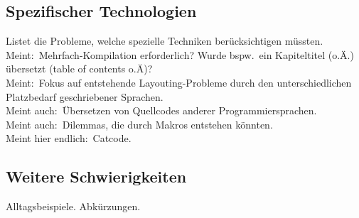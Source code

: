 \subsection{Spezifischer Technologien}
Listet die Probleme, welche spezielle Techniken berücksichtigen müssten.\\
Meint:\ Mehrfach-Kompilation erforderlich? Wurde bspw.\ ein Kapiteltitel (o.Ä.) übersetzt (table of contents o.Ä)?\\
Meint:\ Fokus auf entstehende Layouting-Probleme durch den unterschiedlichen Platzbedarf geschriebener Sprachen.\\
Meint auch:\ Übersetzen von Quellcodes anderer Programmiersprachen.\\
Meint auch:\ Dilemmas, die durch Makros entstehen könnten.\\
Meint hier endlich:\ Catcode.\\

\subsection{Weitere Schwierigkeiten}
Alltagsbeispiele. Abkürzungen. 